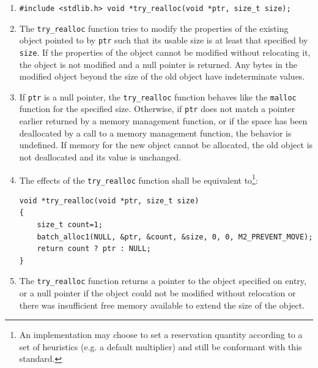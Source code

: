 \documentclass[wd]{isov2}
\begin{document}
{
\begin{enumerate}
\renewcommand{\theenumi}{\arabic{enumi}}
\item \texttt{\#include <stdlib.h>\linebreak
void *try\_realloc(void *ptr, size\_t size);}
\item The \texttt{try\_realloc} function tries to modify the properties of the existing object pointed to by \texttt{ptr} such that its usable size is at least that specified by \texttt{size}. If the properties of the object cannot be modified without relocating it, the object is not modified and a null pointer is returned. Any bytes in the modified object beyond the size of the old object have indeterminate values.
\item If \texttt{ptr} is a null pointer, the \texttt{try\_realloc} function behaves like the \texttt{malloc} function for the specified size. Otherwise, if \texttt{ptr} does not match a pointer earlier returned by a memory management function, or if the space has been deallocated by a call to a memory management function, the behavior is undefined. If memory for the new object cannot be allocated, the old object is not deallocated and its value is unchanged.
\color{changed}
\item The effects of the \texttt{try\_realloc} function shall be equivalent to\footnote{An implementation may choose to set a reservation quantity according to a set of heuristics (e.g. a default multiplier) and still be conformant with this standard.}:
\begin{verbatim}
void *try_realloc(void *ptr, size_t size)
{
    size_t count=1;
    batch_alloc1(NULL, &ptr, &count, &size, 0, 0, M2_PREVENT_MOVE);
    return count ? ptr : NULL;
}
\end{verbatim}
\item The \texttt{try\_realloc} function returns a pointer to the object specified on entry, or a null pointer if the object could not be modified without relocation or there was insufficient free memory available to extend the size of the object.
\end{enumerate}
\color{black}

}
\end{document}
